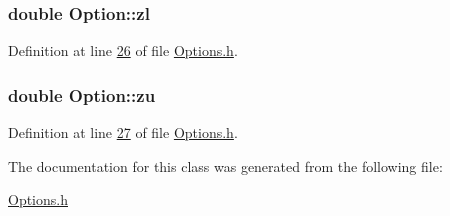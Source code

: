 \hypertarget{classOption_a37c65100e75876d4f4b76e8647c6702d}{
\subsubsection[{zl}]{\setlength{\rightskip}{0pt plus 5cm}double Option\+::zl}}\label{classOption_a37c65100e75876d4f4b76e8647c6702d}


Definition at line \hyperlink{Options_8h_source_l00026}{26} of file \hyperlink{Options_8h_source}{Options.\+h}.

\hypertarget{classOption_aa80c6f304df39def3df2bf26afbbfe79}{
\subsubsection[{zu}]{\setlength{\rightskip}{0pt plus 5cm}double Option\+::zu}}\label{classOption_aa80c6f304df39def3df2bf26afbbfe79}


Definition at line \hyperlink{Options_8h_source_l00027}{27} of file \hyperlink{Options_8h_source}{Options.\+h}.



The documentation for this class was generated from the following file\+:\begin{DoxyCompactItemize}
\item 
\hyperlink{Options_8h}{Options.\+h}\end{DoxyCompactItemize}
